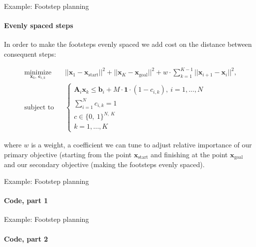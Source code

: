 \documentclass{beamer}
\begin{document}
\begin{frame}{Example: Footstep planning}
\framesubtitle{Evenly spaced steps}
\begin{flushleft}

In order to make the footsteps evenly spaced we add cost on the distance between consequent steps:

\begin{equation*}
\begin{aligned}
& \underset{\mathbf{x}_k, \ \mathbf{c}_{i,k}}{\text{minimize}}
& & ||\mathbf{x}_1 - \mathbf{x}_{\text{start}}||^2 + ||\mathbf{x}_K - \mathbf{x}_{\text{goal}}||^2 + w \cdot \sum_{k=1}^{K-1} ||\mathbf{x}_{i+1} - \mathbf{x}_i||^2, \\
& \text{subject to}
& & \begin{cases}
    \mathbf{A}_i \mathbf{x}_k \leq \mathbf{b}_i + M \cdot \mathbf{1} \cdot (1 - c_{i, k}), \ i = 1,...,N \\
    \sum_{i=1}^N c_{i, k} = 1 \\
    c  \in \{0, \ 1 \}^{N, \ K} \\
    k = 1,...,K
    \end{cases}
\end{aligned}
\end{equation*}

where $w$ is a weight, a coefficient we can tune to adjust relative importance of our primary objective (starting from the point $\mathbf{x}_{\text{start}}$ and finishing at the point $\mathbf{x}_{\text{goal}}$ and our secondary objective (making the footsteps evenly spaced).  
 
\end{flushleft}
\end{frame}




\begin{frame}{Example: Footstep planning}
\framesubtitle{Code, part 1}
\begin{flushleft}


 
\end{flushleft}
\end{frame}


\begin{frame}{Example: Footstep planning}
\framesubtitle{Code, part 2}
\begin{flushleft}


 
\end{flushleft}
\end{frame}
\end{document}
